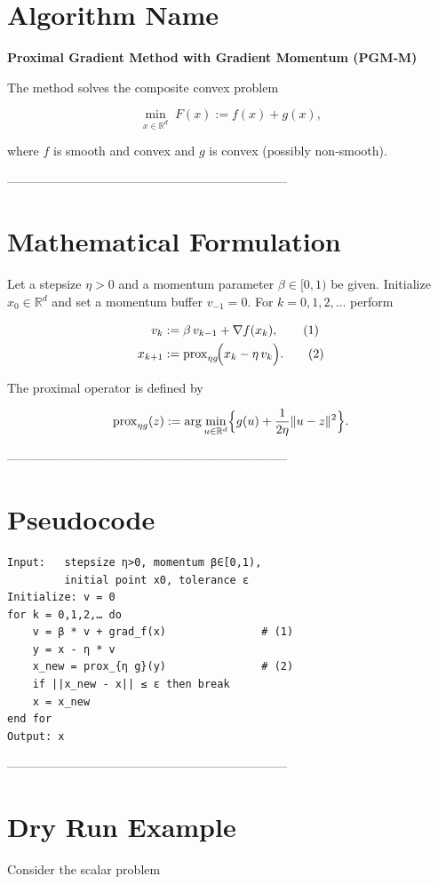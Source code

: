 \documentclass{article}
\newcommand{\prox}{\operatorname{prox}}
\newcommand{\R}{\mathbb{R}}
\begin{document}
\section*{Algorithm Name}
\textbf{Proximal Gradient Method with Gradient Momentum (PGM‑M)}  

The method solves the composite convex problem  

\[
\min_{x\in\R^{d}}\;F(x):=f(x)+g(x),
\]

where \(f\) is smooth and convex and \(g\) is convex (possibly non‑smooth).

--------------------------------------------------------------------

\section*{Mathematical Formulation}
Let a stepsize \(\eta>0\) and a momentum parameter \(\beta\in[0,1)\) be given.  
Initialize \(x_{0}\in\R^{d}\) and set a momentum buffer \(v_{-1}=0\).  
For \(k=0,1,2,\dots\) perform  

\[
\begin{aligned}
v_{k} &:= \beta\,v_{k-1}+ \nabla f(x_{k}), \tag{1}\\
x_{k+1} &:= \prox_{\eta g}\!\Bigl(x_{k}-\eta\,v_{k}\Bigr). \tag{2}
\end{aligned}
\]

The proximal operator is defined by  

\[
\prox_{\eta g}(z):=\arg\min_{u\in\R^{d}}\Bigl\{ g(u)+\frac{1}{2\eta}\|u-z\|^{2}\Bigr\}.
\]

--------------------------------------------------------------------

\section*{Pseudocode}
\begin{verbatim}
Input:   stepsize η>0, momentum β∈[0,1), 
         initial point x0, tolerance ε
Initialize: v = 0
for k = 0,1,2,… do
    v = β * v + grad_f(x)               # (1)
    y = x - η * v
    x_new = prox_{η g}(y)               # (2)
    if ||x_new - x|| ≤ ε then break
    x = x_new
end for
Output: x
\end{verbatim}

--------------------------------------------------------------------

\section*{Dry Run Example}
Consider the scalar problem  
\end{document}
